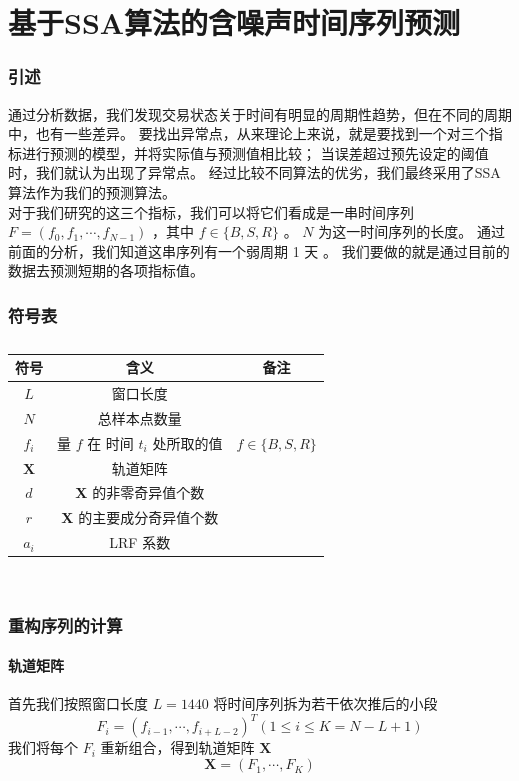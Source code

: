\documentclass[a4paper]{article}
\begin{document}
\part{基于SSA算法的含噪声时间序列预测}
\section{引述}
\indent 通过分析数据，我们发现交易状态关于时间有明显的周期性趋势，但在不同的周期中，也有一些差异。
要找出异常点，从来理论上来说，就是要找到一个对三个指标进行预测的模型，并将实际值与预测值相比较；
当误差超过预先设定的阈值时，我们就认为出现了异常点。
经过比较不同算法的优劣，我们最终采用了SSA算法作为我们的预测算法。
\\
\indent 对于我们研究的这三个指标，我们可以将它们看成是一串时间序列 $F=(f_0, f_1, \cdots, f_{N-1})$ ，其中 $f \in \{B, S, R\}$ 。
$N$ 为这一时间序列的长度。
通过前面的分析，我们知道这串序列有一个弱周期 1 天 。
我们要做的就是通过目前的数据去预测短期的各项指标值。
\section*{符号表}
\begin{table}[H]
	\centering
	\caption{}
	\label{tab:ssa_symbols}
	\begin{tabular}{ccc}
		\hline
		符号 & 含义 & 备注 \\
		\hline
		$L$ & 窗口长度 & \\
		$N$ & 总样本点数量 & \\
		$f_i$ & 量 $f$ 在 时间 $t_i$ 处所取的值 & $f \in \{B, S, R\}$ \\
		$\textbf{X}$ & 轨道矩阵 & \\
		$d$ & \textbf{X} 的非零奇异值个数 & \\
		$r$ & \textbf{X} 的主要成分奇异值个数 & \\
		$a_i$ & LRF 系数 & \\
		\hline
	\end{tabular} \\
\end{table}

\section{重构序列的计算}
\subsection{轨道矩阵}
首先我们按照窗口长度 $L = 1440$ 将时间序列拆为若干依次推后的小段
\begin{equation}
	\label{eqn:F_i}
	F_i = (f_{i-1}, \cdots, f_{i+L-2})^T  (1 \leq i \leq K = N - L + 1)
\end{equation}
我们将每个 $F_i$ 重新组合，得到轨道矩阵 $\textbf{X}$
\begin{equation}
	\label{eqn:X}
	\textbf{X} = (F_1, \cdots, F_K)
\end{equation}
\end{document}
